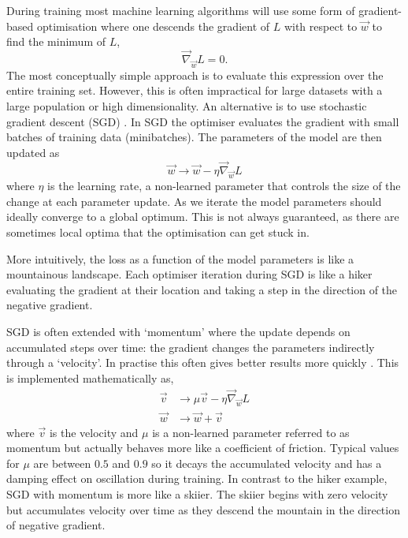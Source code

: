 During training most machine learning algorithms will use some form of gradient-based optimisation where one descends the gradient of $L$ with respect to $\vec{w}$ to find the minimum of $L$,
\begin{equation}
    \vec{\nabla}_{\vec{w}}L = 0.
\end{equation}
The most conceptually simple approach is to evaluate this expression over the entire training set. However, this is often impractical for large datasets with a large population or high dimensionality. 
An alternative is to use stochastic gradient descent (SGD) \cite{DeepLearningBook}. In SGD the optimiser evaluates the gradient with small batches of training data (minibatches). 
The parameters of the model are then updated as
\begin{equation}
    \vec{w} \rightarrow \vec{w} - \eta\vec{\nabla}_{\vec{w}}L
\end{equation}
where $\eta$ is the learning rate, a non-learned parameter that controls the size of the change at each parameter update. 
As we iterate the model parameters should ideally converge to a global optimum. 
This is not always guaranteed, as there are sometimes local optima that the optimisation can get stuck in. 

More intuitively, the loss as a function of the model parameters is like a mountainous landscape. 
Each optimiser iteration during SGD is like a hiker evaluating the gradient at their location and taking a step in the direction of the negative gradient.

SGD is often extended with `momentum' where the update depends on accumulated steps over time: the gradient changes the parameters indirectly through a `velocity'. 
In practise this often gives better results more quickly \cite{CS231n}.
This is implemented mathematically as,
\begin{equation}
    \begin{split}
        \vec{v} &\rightarrow \mu\vec{v} - \eta\vec{\nabla}_{\vec{w}}L \\
        \vec{w} &\rightarrow \vec{w} + \vec{v}
    \end{split}
\end{equation}
where $\vec{v}$ is the velocity and $\mu$ is a non-learned parameter referred to as momentum but actually behaves more like a coefficient of friction. 
Typical values for $\mu$ are between $0.5$ and $0.9$ so it decays the accumulated velocity and has a damping effect on oscillation during training. 
In contrast to the hiker example, SGD with momentum is more like a skiier. 
The skiier begins with zero velocity but accumulates velocity over time as they descend the mountain in the direction of negative gradient. 







